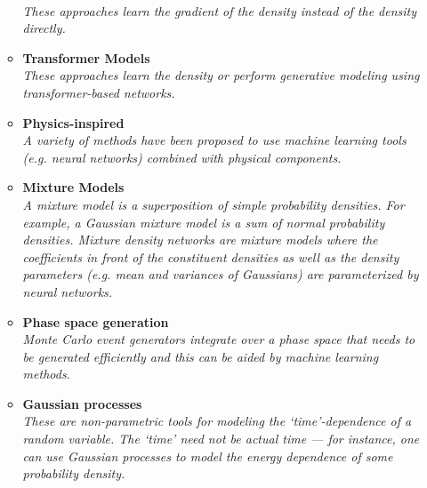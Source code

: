 \documentclass[12pt,letterpaper]{article}
\begin{document}
\begin{itemize}
\begin{itemize}
		\\\textit{These approaches learn the gradient of the density instead of the density directly.}
		\item \textbf{Transformer Models}~\cite{Barman:2025bpx,Yip:2025hon,Spinner:2025prg,Wang:2024rup,Brehmer:2024yqw,Quetant:2024ftg,Spinner:2024hjm,Paeng:2024ary,Li:2023xhj,Tomiya:2023jdy,Raine:2023fko,Butter:2023fov,Finke:2023veq}
		\\\textit{These approaches learn the density or perform generative modeling using transformer-based networks.}
		\item \textbf{Physics-inspired}~\cite{Abasov:2024hyq,Larkoski:2023xam,Barenboim:2021vzh,Lai:2020byl,1808876,Andreassen:2019txo,Andreassen:2018apy}
		\\\textit{A variety of methods have been proposed to use machine learning tools (e.g. neural networks) combined with physical components.}
		\item \textbf{Mixture Models}~\cite{Vermunt:2023fsr,Liu:2022dem,Jia:2022ulh,Graziani:2021vai,Burton:2021tsd,Chen:2020uds}
		\\\textit{A mixture model is a superposition of simple probability densities.  For example, a Gaussian mixture model is a sum of normal probability densities.  Mixture density networks are mixture models where the coefficients in front of the constituent densities as well as the density parameters (e.g. mean and variances of Gaussians) are parameterized by neural networks.}
		\item \textbf{Phase space generation}~\cite{Pyretzidis:2025stx,Bothmann:2025lwg,Searle:2025cnj,Janssen:2025zke,deSouza:2025bpl,Oh:2025fpq,Nachman:2025lid,Baruah:2025nby,Diaz:2024sxg,Ban:2024bqy,Kofler:2024efb,Deutschmann:2024lml,Calisto:2023vmm,Singh:2023yvj,Renteria-Estrada:2023buo,Heimel:2022wyj,Jinno:2022sbr,Maitre:2022xle,Yoon:2020zmb,Danziger:2021eeg,Backes:2020vka,Verheyen:2020bjw,Chen:2020nfb,Nachman:2020fff,Carrazza:2020rdn,Klimek:2018mza,Gao:2020vdv,Gao:2020zvv,Bothmann:2020ywa,Bendavid:2017zhk}
		\\\textit{Monte Carlo event generators integrate over a phase space that needs to be generated efficiently and this can be aided by machine learning methods.}
		\item \textbf{Gaussian processes}~\cite{Cisbani:2019xta,1804325,Bertone:2016mdy,Frate:2017mai}
                  \\\textit{These are non-parametric tools for modeling the `time'-dependence of a random variable.  The `time' need not be actual time --- for instance, one can use Gaussian processes to model the energy dependence of some probability density.}

\end{itemize}
\end{itemize}
\end{document}
